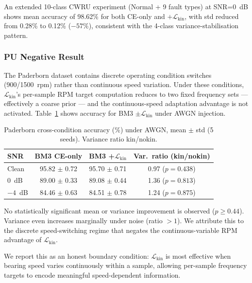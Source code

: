 An extended 10-class CWRU experiment (Normal + 9 fault types)
at SNR=0~dB shows mean accuracy of 98.62\% for both CE-only and
$+\mathcal{L}_{\text{kin}}$, with std reduced from 0.28\% to 0.12\%
($-57\%$), consistent with the 4-class variance-stabilisation pattern.

\subsubsection{PU Negative Result}
\label{subsubsec:pu_negative}

The Paderborn dataset contains discrete operating condition switches
(900/1500~rpm) rather than continuous speed variation.
Under these conditions, $\mathcal{L}_{\text{kin}}$'s per-sample RPM target
computation reduces to two fixed frequency sets — effectively a coarse prior —
and the continuous-speed adaptation advantage is not activated.
Table~\ref{tab:pu_noise} shows accuracy for BM3 $\pm\mathcal{L}_{\text{kin}}$
under AWGN injection.

\begin{table}[htbp]
\centering
\caption{Paderborn cross-condition accuracy (\%) under AWGN,
         mean $\pm$ std (5 seeds). Variance ratio kin/nokin.}
\label{tab:pu_noise}
\begin{tabular}{lccc}
\toprule
SNR & BM3 CE-only & BM3 +$\mathcal{L}_{\text{kin}}$ & Var.\ ratio (kin/nokin) \\
\midrule
Clean & 95.82 $\pm$ 0.72 & 95.70 $\pm$ 0.71 & 0.97 ($p=0.438$) \\
0~dB  & 89.00 $\pm$ 0.33 & 89.08 $\pm$ 0.44 & 1.36 ($p=0.813$) \\
$-4$~dB & 84.46 $\pm$ 0.63 & 84.51 $\pm$ 0.78 & 1.24 ($p=0.875$) \\
\bottomrule
\end{tabular}
\begin{tablenotes}
\item No statistically significant mean or variance improvement is observed
      ($p \geq 0.44$). Variance even increases marginally under noise
      (ratio $> 1$). We attribute this to the discrete speed-switching regime
      that negates the continuous-variable RPM advantage of
      $\mathcal{L}_{\text{kin}}$.
\end{tablenotes}
\end{table}

We report this as an honest boundary condition:
$\mathcal{L}_{\text{kin}}$ is most effective when bearing speed varies
continuously within a sample, allowing per-sample frequency targets to
encode meaningful speed-dependent information.


